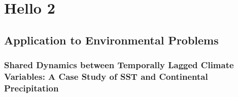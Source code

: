 \part{Hello 2}
\chapter{Application to Environmental Problems}

\ifpdf
    \graphicspath{{chapter3/figs/raster/}{chapter3/figs/pdf/}{chapter3/figs/}}
\else
    \graphicspath{{chapter3/figs/vector/}{chapter3/figs/}}
\fi

\section{Shared Dynamics between Temporally Lagged Climate Variables: A Case Study of SST and Continental Precipitation}


